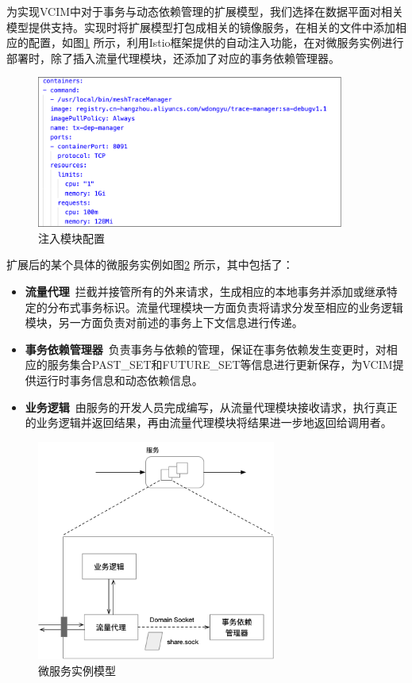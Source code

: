 \documentclass[macfonts,master]{njuthesis}
\begin{document}
为实现VCIM中对于事务与动态依赖管理的扩展模型，我们选择在数据平面对相关模型提供支持。实现时将扩展模型打包成相关的镜像服务，在相关的文件中添加相应的配置，如图\ref{fig:injector} 所示，利用Istio框架提供的自动注入功能，在对微服务实例进行部署时，除了插入流量代理模块，还添加了对应的事务依赖管理器。

\begin{figure}[!htbp]
  \centering
  \includegraphics[width= 0.9\textwidth]{image/injector.png}
  \caption{注入模块配置}
  \label{fig:injector}
\end{figure}

扩展后的某个具体的微服务实例如图\ref{fig:instance_model} 所示，其中包括了：

\begin{itemize}
	\item \textbf{流量代理}~拦截并接管所有的外来请求，生成相应的本地事务并添加或继承特定的分布式事务标识。流量代理模块一方面负责将请求分发至相应的业务逻辑模块，另一方面负责对前述的事务上下文信息进行传递。
	\item \textbf{事务依赖管理器}~负责事务与依赖的管理，保证在事务依赖发生变更时，对相应的服务集合PAST\_SET和FUTURE\_SET等信息进行更新保存，为VCIM提供运行时事务信息和动态依赖信息。
	\item \textbf{业务逻辑}~由服务的开发人员完成编写，从流量代理模块接收请求，执行真正的业务逻辑并返回结果，再由流量代理模块将结果进一步地返回给调用者。
\end{itemize}

\begin{figure}[!htbp]
  \centering
  \includegraphics[width= 0.7\textwidth]{image/instance_model.png}
  \caption{微服务实例模型}
  \label{fig:instance_model}
\end{figure}
\end{document}
